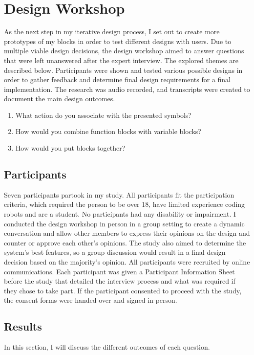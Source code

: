\documentclass[oneside,%
                    author={Malak Hajji},
                    degree={BSc},
                    title={Designing An Accessible Computational Toolkit For Students},
                  subtitle={With Mixed Visual Abilities}]{dissertation}
\begin{document}
\section{Design Workshop}
As the next step in my iterative design process, I set out to create more prototypes of my blocks in order to test different designs with users. 
Due to multiple viable design decisions, the design workshop aimed to answer questions that were left unanswered after the expert interview. The explored themes are described below. 
Participants were shown and tested various possible designs in order to gather feedback and determine final design requirements for a final implementation. 
The research was audio recorded, and transcripts were created to document the main design outcomes.
\begin{enumerate}
    \item What action do you associate with the presented symbols?
    \item How would you combine function blocks with variable blocks?
    \item How would you put blocks together?
   
    
\end{enumerate}
\subsection{Participants}

Seven participants partook in my study. All participants fit the participation criteria, which required the person to be over 18, have limited experience coding robots and are a student. No participants had any disability or impairment. I conducted the design workshop in person in a group setting to create a dynamic conversation and allow other members to express their opinions on the design and counter or approve each other's opinions. The study also aimed to determine the system's best features, so a group discussion would result in a final design decision based on the majority's opinion.  
All participants were recruited by online communications. Each participant was given a Participant Information Sheet before the study that detailed the interview process and what was required if they chose to take part. If the participant consented to proceed with the study, the consent forms were handed over and signed in-person.

\subsection{Results}
In this section, I will discuss the different outcomes of each question.
\end{document}
